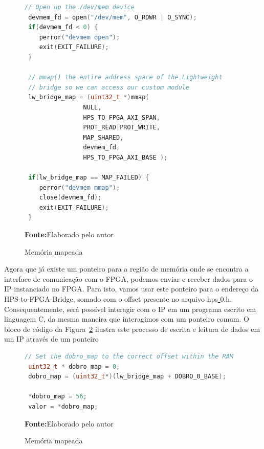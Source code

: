 \begin{figure}[ht]
\caption{Memória mapeada}
\begin{center}
\begin{lstlisting}[language=C++, backgroundcolor=\color{gray!10}]
 // Open up the /dev/mem device
 devmem_fd = open("/dev/mem", O_RDWR | O_SYNC);
 if(devmem_fd < 0) {
	perror("devmem open"); 
	exit(EXIT_FAILURE);
 }	

 // mmap() the entire address space of the Lightweight 
 // bridge so we can access our custom module 
 lw_bridge_map = (uint32_t *)mmap( 
				NULL, 
				HPS_TO_FPGA_AXI_SPAN, 
				PROT_READ|PROT_WRITE, 
				MAP_SHARED, 
				devmem_fd, 
				HPS_TO_FPGA_AXI_BASE ); 
				
 if(lw_bridge_map == MAP_FAILED) {
	perror("devmem mmap");
	close(devmem_fd);
	exit(EXIT_FAILURE);
 }
\end{lstlisting}
{\small \textbf{Fonte:}Elaborado pelo autor}	
\end{center}\label{fig:codigomap}
\end{figure} 

Agora que já existe um ponteiro para a região de memória onde se encontra a interface de comunicação com o FPGA, podemos enviar e receber dados para o IP instanciado no FPGA. Para isto, vamos usar este ponteiro para o endereço da HPS-to-FPGA-Bridge, somado com o offset presente no arquivo hps\underline{ }0.h.  Consequentemente, será possível interagir com o IP em um programa escrito em linguagem C, da mesma maneira que interagimos com um ponteiro comum. O bloco de código da Figura~\ref{fig:codigomapdobro} ilustra este processo de escrita e leitura de dados em um IP através de um ponteiro

\begin{figure}[ht]
\caption{Memória mapeada}
\begin{center}
\begin{lstlisting}[language=C++, backgroundcolor=\color{gray!10}]
 // Set the dobro_map to the correct offset within the RAM
 uint32_t * dobro_map = 0;
 dobro_map = (uint32_t*)(lw_bridge_map + DOBRO_0_BASE);

 *dobro_map = 56;
 valor = *dobro_map;
\end{lstlisting}
{\small \textbf{Fonte:}Elaborado pelo autor}	
\end{center}\label{fig:codigomapdobro}
	
\end{figure}